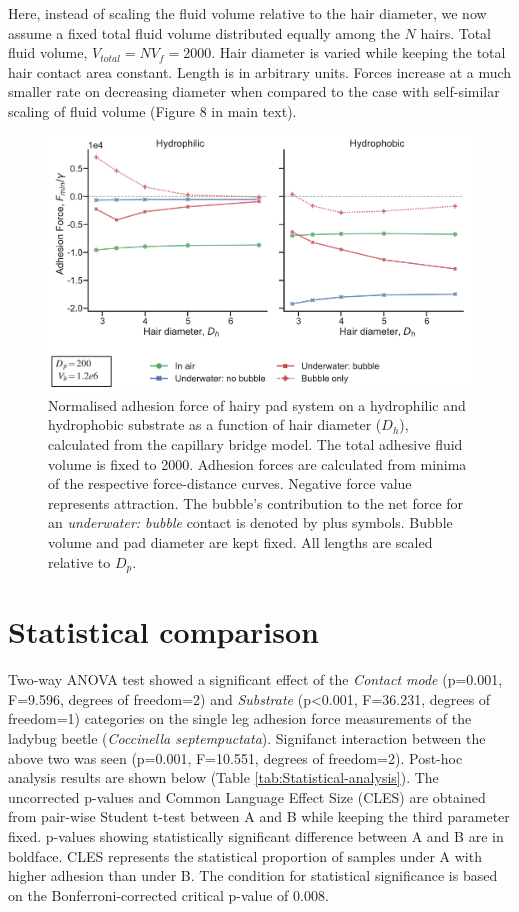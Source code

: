 \documentclass[english]{achemso}
\begin{document}
Here, instead of scaling the fluid volume relative to the hair diameter,
we now assume a fixed total fluid volume distributed equally among
the $N$ hairs. Total fluid volume, $V_{total}=NV_{f}=2000$. Hair
diameter is varied while keeping the total hair contact area constant.
Length is in arbitrary units. Forces increase at a much smaller rate
on decreasing diameter when compared to the case with self-similar
scaling of fluid volume (Figure 8 in main text).

\begin{figure}[H]
\includegraphics{FigureS3-Effect_of_hair_size(constant_vol)}

\caption{Normalised adhesion force of hairy pad system on a hydrophilic and
hydrophobic substrate as a function of hair diameter ($D_{h}$), calculated
from the capillary bridge model. The total adhesive fluid volume is
fixed to 2000. Adhesion forces are calculated from minima of the respective
force-distance curves. Negative force value represents attraction.
The bubble's contribution to the net force for an \emph{underwater:
bubble} contact is denoted by plus symbols. Bubble volume and pad
diameter are kept fixed. All lengths are scaled relative to $D_{p}$.}
\end{figure}


\section{Statistical comparison}

Two-way ANOVA test showed a significant effect of the \emph{Contact mode} (p=0.001, F=9.596, degrees of freedom=2) 
and \emph{Substrate} (p<0.001, F=36.231, degrees of freedom=1) categories on the single leg adhesion force measurements
of the ladybug beetle (\emph{Coccinella septempuctata}). Signifanct interaction between the above two was seen (p=0.001, F=10.551, degrees of freedom=2). Post-hoc analysis results are shown below (Table \ref{tab:Statistical-analysis}).
The uncorrected p-values and Common Language Effect Size (CLES) are
obtained from pair-wise Student t-test between A and B while
keeping the third parameter fixed. p-values showing statistically
significant difference between A and B are in boldface. 
CLES represents the statistical proportion of samples under A with higher adhesion than under B. The condition
for statistical significance is based on the Bonferroni-corrected
critical p-value of 0.008.
\end{document}
